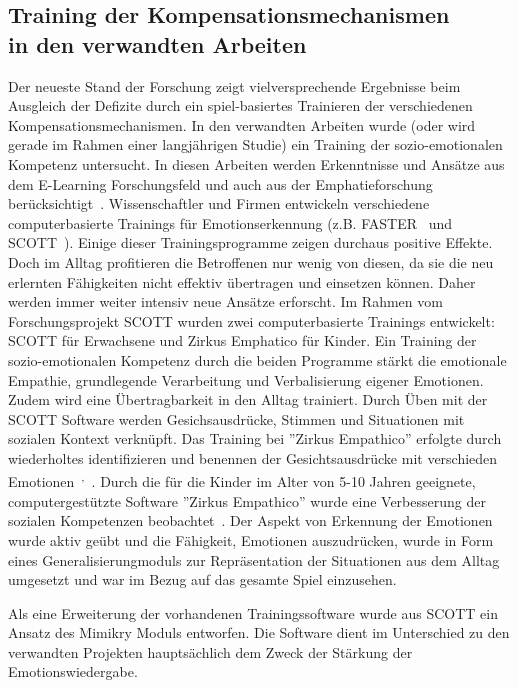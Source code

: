\subsection{Training der Kompensationsmechanismen\\ in den verwandten Arbeiten}
Der neueste Stand der Forschung zeigt vielversprechende Ergebnisse beim Ausgleich der Defizite durch ein spiel-basiertes Trainieren der verschiedenen Kompensationsmechanismen. In den verwandten Arbeiten wurde (oder wird gerade im Rahmen einer langjährigen Studie) ein Training der sozio-emotionalen Kompetenz untersucht. In diesen Arbeiten werden Erkenntnisse und Ansätze aus dem E-Learning Forschungsfeld und auch aus der Emphatieforschung berücksichtigt~\cite{Zirkus}. 
Wissenschaftler und Firmen entwickeln verschiedene computerbasierte Trainings für Emotionserkennung (z.B. FASTER~\cite{Faster} und SCOTT~\cite{Scott}).
Einige dieser Trainingsprogramme zeigen durchaus positive Effekte. Doch im Alltag profitieren die Betroffenen nur wenig von diesen, da sie die neu erlernten Fähigkeiten nicht effektiv übertragen und einsetzen können. Daher werden immer weiter intensiv neue Ansätze erforscht.
Im Rahmen vom Forschungsprojekt SCOTT wurden zwei computerbasierte Trainings entwickelt: SCOTT für Erwachsene und Zirkus Emphatico für Kinder. Ein Training der sozio-emotionalen Kompetenz durch die beiden Programme stärkt die emotionale Empathie, grundlegende Verarbeitung und Verbalisierung eigener Emotionen. Zudem wird eine Übertragbarkeit in den Alltag trainiert. 
Durch Üben mit der SCOTT Software werden Gesichsausdrücke, Stimmen und Situationen mit sozialen Kontext verknüpft. Das Training bei ''Zirkus Empathico'' erfolgte durch wiederholtes identifizieren und benennen der Gesichtsausdrücke mit verschieden Emotionen~\cite{Scott}\textsuperscript{,}~\cite{Zirkus}.
Durch die für die Kinder im Alter von 5-10 Jahren geeignete, computergestützte Software ''Zirkus Empathico'' wurde eine Verbesserung der sozialen Kompetenzen beobachtet~\cite{Zirkus}.
Der Aspekt von Erkennung der Emotionen wurde aktiv geübt und die Fähigkeit, Emotionen auszudrücken, wurde in Form eines Generalisierungmoduls zur Repräsentation der Situationen aus dem Alltag umgesetzt und war im Bezug auf das gesamte Spiel einzusehen. 

Als eine Erweiterung der vorhandenen Trainingssoftware wurde aus SCOTT ein Ansatz des Mimikry Moduls entworfen. Die Software dient im Unterschied zu den verwandten Projekten hauptsächlich dem Zweck der Stärkung der Emotionswiedergabe.

